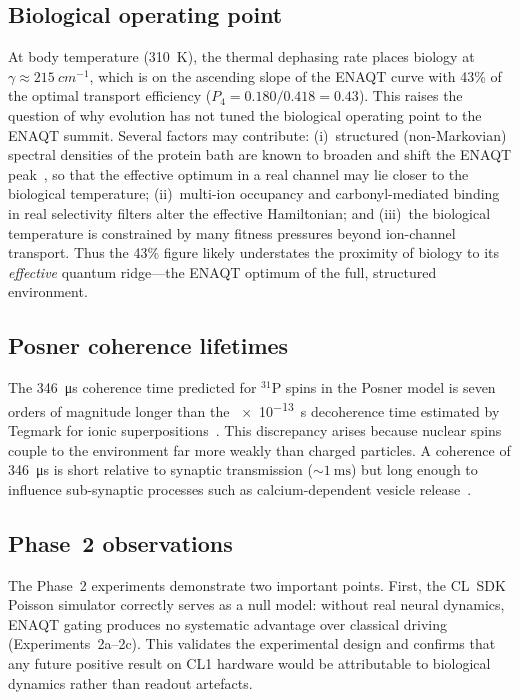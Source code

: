 \documentclass[twocolumn,11pt]{article}
\newcommand{\Pfour}{P_{4}}
\begin{document}
\subsection{Biological operating point}

At body temperature (\SI{310}{\kelvin}), the thermal dephasing
rate places biology at $\gamma \approx \SI{215}{cm^{-1}}$,
which is on the ascending slope of the ENAQT curve with 43\%
of the optimal transport efficiency
($\Pfour = 0.180 / 0.418 = 0.43$).  This raises the question of why
evolution has not tuned the biological operating point to the
ENAQT summit.  Several factors may contribute:
(i)~structured (non-Markovian) spectral densities of the
protein bath are known to broaden and shift the ENAQT
peak~\cite{Cao2020}, so that the effective optimum in a real
channel may lie closer to the biological temperature;
(ii)~multi-ion occupancy and carbonyl-mediated binding in real
selectivity filters alter the effective Hamiltonian;
and (iii)~the biological temperature is constrained by many
fitness pressures beyond ion-channel transport.
Thus the 43\% figure likely understates the proximity of
biology to its \emph{effective} quantum ridge---the
ENAQT optimum of the full, structured environment.

\subsection{Posner coherence lifetimes}

The \SI{346}{\micro\second} coherence time predicted for
$^{31}$P spins in the Posner model is seven orders of magnitude
longer than the \SI{e-13}{\second} decoherence time estimated
by Tegmark for ionic superpositions~\cite{Tegmark2000}.
This discrepancy arises because nuclear spins couple to the
environment far more weakly than charged particles.
A coherence of \SI{346}{\micro\second} is short relative to
synaptic transmission (${\sim}\SI{1}{\milli\second}$) but
long enough to influence sub-synaptic processes such as
calcium-dependent vesicle release~\cite{Fisher2015}.

\subsection{Phase~2 observations}

The Phase~2 experiments demonstrate two important points.
First, the CL~SDK Poisson simulator correctly serves as a null
model: without real neural dynamics, ENAQT gating produces no
systematic advantage over classical driving
(Experiments~2a--2c).  This validates the experimental design
and confirms that any future positive result on CL1 hardware
would be attributable to biological dynamics rather than
readout artefacts.
\end{document}
